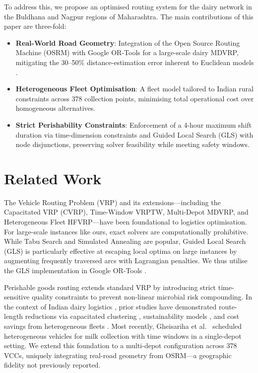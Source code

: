 \documentclass{svproc}
\begin{document}
To address this, we propose an optimised routing system for the dairy network in the Buldhana and Nagpur regions of Maharashtra. The main contributions of this paper are three-fold:
\begin{itemize}
    \item \textbf{Real-World Road Geometry}: Integration of the Open Source Routing Machine (OSRM) with Google OR-Tools for a large-scale dairy MDVRP, mitigating the 30--50\% distance-estimation error inherent to Euclidean models \cite{BALLOU2002,Giacomin2015}.
    \item \textbf{Heterogeneous Fleet Optimisation}: A fleet model tailored to Indian rural constraints across 378 collection points, minimising total operational cost over homogeneous alternatives.
    \item \textbf{Strict Perishability Constraints}: Enforcement of a 4-hour maximum shift duration via time-dimension constraints and Guided Local Search (GLS) with node disjunctions, preserving solver feasibility while meeting safety windows.
\end{itemize}

\section{Related Work}
\label{sec_related}

The Vehicle Routing Problem (VRP) and its extensions---including the Capacitated VRP (CVRP), Time-Window VRPTW, Multi-Depot MDVRP, and Heterogeneous Fleet HFVRP---have been foundational to logistics optimisation. For large-scale instances like ours, exact solvers are computationally prohibitive. While Tabu Search and Simulated Annealing are popular, Guided Local Search (GLS) \cite{Voudouris1999} is particularly effective at escaping local optima on large instances by augmenting frequently traversed arcs with Lagrangian penalties. We thus utilise the GLS implementation in Google OR-Tools \cite{ORTools2024}.

Perishable goods routing extends standard VRP by introducing strict time-sensitive quality constraints to prevent non-linear microbial risk compounding. In the context of Indian dairy logistics \cite{Shukla2013,Gupta2020,NDDB2024}, prior studies have demonstrated route-length reductions via capacitated clustering \cite{Rautela2019}, sustainability models \cite{Patel2019}, and cost savings from heterogeneous fleets \cite{Ravichandran2020}. Most recently, Gheisariha et al.\ \cite{Gheisariha2023} scheduled heterogeneous vehicles for milk collection with time windows in a single-depot setting. We extend this foundation to a multi-depot configuration across 378 VCCs, uniquely integrating real-road geometry from OSRM---a geographic fidelity not previously reported.
\end{document}
